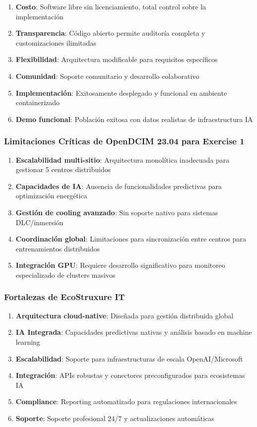 \documentclass[12pt,a4paper]{article}
\begin{document}
\begin{enumerate}
    \item \textbf{Costo}: Software libre sin licenciamiento, total control sobre la implementación
    \item \textbf{Transparencia}: Código abierto permite auditoría completa y customizaciones ilimitadas
    \item \textbf{Flexibilidad}: Arquitectura modificable para requisitos específicos
    \item \textbf{Comunidad}: Soporte comunitario y desarrollo colaborativo
    \item \textbf{Implementación}: Exitosamente desplegado y funcional en ambiente containerizado
    \item \textbf{Demo funcional}: Población exitosa con datos realistas de infraestructura IA
\end{enumerate}

\subsubsection{Limitaciones Críticas de OpenDCIM 23.04 para Exercise 1}

\begin{enumerate}
    \item \textbf{Escalabilidad multi-sitio}: Arquitectura monolítica inadecuada para gestionar 5 centros distribuidos
    \item \textbf{Capacidades de IA}: Ausencia de funcionalidades predictivas para optimización energética
    \item \textbf{Gestión de cooling avanzado}: Sin soporte nativo para sistemas DLC/inmersión
    \item \textbf{Coordinación global}: Limitaciones para sincronización entre centros para entrenamientos distribuidos
    \item \textbf{Integración GPU}: Requiere desarrollo significativo para monitoreo especializado de clusters masivos
\end{enumerate}

\subsubsection{Fortalezas de EcoStruxure IT}

\begin{enumerate}
    \item \textbf{Arquitectura cloud-native}: Diseñada para gestión distribuida global
    \item \textbf{IA Integrada}: Capacidades predictivas nativas y análisis basado en machine learning
    \item \textbf{Escalabilidad}: Soporte para infraestructuras de escala OpenAI/Microsoft
    \item \textbf{Integración}: APIs robustas y conectores preconfigurados para ecosistemas IA
    \item \textbf{Compliance}: Reporting automatizado para regulaciones internacionales
    \item \textbf{Soporte}: Soporte profesional 24/7 y actualizaciones automáticas
\end{enumerate}
\end{document}
